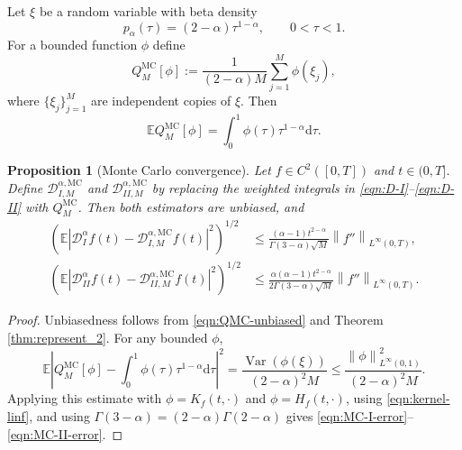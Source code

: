 \documentclass[preprint,3p,times]{elsarticle}
\newcommand{\norm}[1]{\left\lVert #1\right\rVert}
\newcommand{\abs}[1]{\left\lvert #1\right\rvert}
\newcommand{\Var}{\operatorname{Var}}
\newtheorem{proposition}{Proposition}[section]
\def\d{\mathrm{d}}
\begin{document}
Let $\xi$ be a random variable with beta density
\begin{equation}\label{eqn:beta-density}
    p_\alpha(\tau)=(2-\alpha)\tau^{1-\alpha},\qquad 0<\tau<1.
\end{equation}
For a bounded function $\phi$ define
\begin{equation}\label{eqn:QMC-def}
    Q_M^{\mathrm{MC}}[\phi]
    :=\frac{1}{(2-\alpha)M}\sum_{j=1}^M\phi(\xi_j),
\end{equation}
where $\{\xi_j\}_{j=1}^M$ are independent copies of $\xi$. Then
\begin{equation}\label{eqn:QMC-unbiased}
    \mathbb E Q_M^{\mathrm{MC}}[\phi]
    =\int_0^1\phi(\tau)\tau^{1-\alpha}\d\tau .
\end{equation}

\begin{proposition}[Monte Carlo convergence]
\label{prop:mc-convergence}
Let $f\in C^2([0,T])$ and $t\in(0,T]$. Define $\mathcal D_{I,M}^{\alpha,\mathrm{MC}}$ and $\mathcal D_{II,M}^{\alpha,\mathrm{MC}}$ by replacing the weighted integrals in \eqref{eqn:D-I}--\eqref{eqn:D-II} with $Q_M^{\mathrm{MC}}$. Then both estimators are unbiased, and
\begin{align}
\left(\mathbb E\abs{\mathcal D_I^\alpha f(t)-\mathcal D_{I,M}^{\alpha,\mathrm{MC}}f(t)}^2\right)^{1/2}
&\le
\frac{(\alpha-1)t^{2-\alpha}}{\Gamma(3-\alpha)\sqrt M}
\norm{f''}_{L^\infty(0,T)},\label{eqn:MC-I-error}\\
\left(\mathbb E\abs{\mathcal D_{II}^\alpha f(t)-\mathcal D_{II,M}^{\alpha,\mathrm{MC}}f(t)}^2\right)^{1/2}
&\le
\frac{\alpha(\alpha-1)t^{2-\alpha}}{2\Gamma(3-\alpha)\sqrt M}
\norm{f''}_{L^\infty(0,T)}.\label{eqn:MC-II-error}
\end{align}
\end{proposition}

\begin{proof}
Unbiasedness follows from \eqref{eqn:QMC-unbiased} and Theorem \ref{thm:represent_2}. For any bounded $\phi$,
\[
    \mathbb E\abs{Q_M^{\mathrm{MC}}[\phi]-\int_0^1\phi(\tau)\tau^{1-\alpha}\d\tau}^2
    =\frac{\Var(\phi(\xi))}{(2-\alpha)^2M}
    \le \frac{\norm{\phi}_{L^\infty(0,1)}^2}{(2-\alpha)^2M}.
\]
Applying this estimate with $\phi=K_f(t,\cdot)$ and $\phi=H_f(t,\cdot)$, using \eqref{eqn:kernel-linf}, and using $\Gamma(3-\alpha)=(2-\alpha)\Gamma(2-\alpha)$ gives \eqref{eqn:MC-I-error}--\eqref{eqn:MC-II-error}.
\end{proof}
\end{document}
